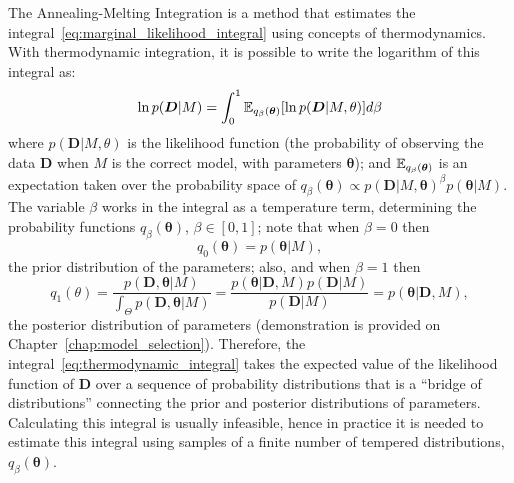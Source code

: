 The Annealing-Melting Integration is a method that estimates the 
integral~\ref{eq:marginal_likelihood_integral} using concepts of 
thermodynamics. With thermodynamic integration, it is possible to write 
the logarithm of this integral as:
\begin{equation}
    \ln p({\bm D}|M) 
            = \int_0^1 \mathbb{E}_{q_\beta({\bm \theta})} 
              [\ln p({\bm D} | M, \theta)] d\beta
        \label{eq:thermodynamic_integral}
\end{equation}
where $p({\bm D}|M,\theta)$ is the likelihood function (the 
probability of observing the data ${\bm D}$ when $M$ is the correct
model, with parameters ${\bm \theta}$); and 
$\mathbb{E}_{q_\beta ({\bm \theta})}$ is an expectation taken over the 
probability space of 
$q_\beta({\bm \theta}) \propto 
p({\bm D}|M, {\bm \theta})^\beta p({\bm \theta}|M)$. The variable 
$\beta$ works in the integral as a temperature term, determining the 
probability functions $q_{\beta}({\bm \theta})$, $\beta \in [0, 1]$; 
note that when $\beta = 0$ then 
\begin{equation}
q_0({\bm \theta}) = p({\bm \theta}|M),
\end{equation}
the prior distribution of the parameters; also, and when 
$\beta = 1$ then 
\begin{equation}
    q_1(\theta) = \frac{p({\bm D}, {\bm \theta}| M)} {\int_{\Theta}
                            p({\bm D}, {\bm \theta}| M)} 
                = \frac{p({\bm \theta} | {\bm D}, M)p({\bm D}|M)} 
                        {p({\bm D} | M)}
                = p({\bm \theta} | {\bm D}, M),
\end{equation}
the posterior distribution of parameters (demonstration is provided on
Chapter~\ref{chap:model_selection}). Therefore, the 
integral~\ref{eq:thermodynamic_integral} takes the expected value of the
likelihood function of ${\bm D}$ over a sequence of probability 
distributions that is a ``bridge of distributions'' connecting the prior
and posterior distributions of parameters. Calculating this integral is 
usually infeasible, hence in practice it is needed to estimate this 
integral using samples of a finite number of tempered distributions, 
$q_\beta({\bm \theta})$.

